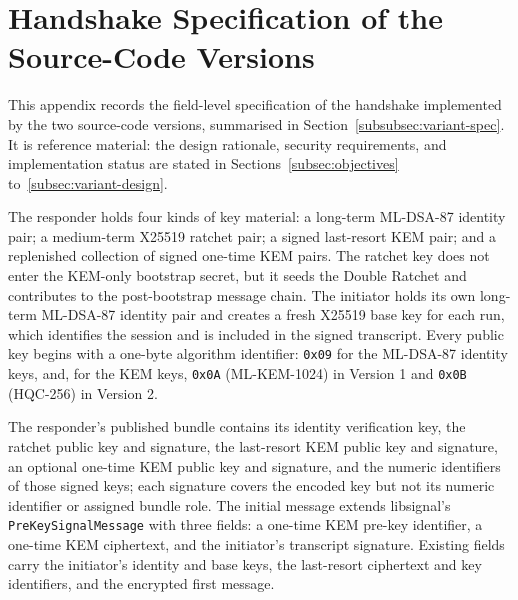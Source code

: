 \section{Handshake Specification of the Source-Code Versions}
\label{app:handshake-spec}

This appendix records the field-level specification of the handshake implemented by the two source-code versions, summarised in Section~\ref{subsubsec:variant-spec}. It is reference material: the design rationale, security requirements, and implementation status are stated in Sections~\ref{subsec:objectives} to~\ref{subsec:variant-design}.

The responder holds four kinds of key material: a long-term ML-DSA-87 identity pair; a medium-term X25519 ratchet pair; a signed last-resort KEM pair; and a replenished collection of signed one-time KEM pairs. The ratchet key does not enter the KEM-only bootstrap secret, but it seeds the Double Ratchet and contributes to the post-bootstrap message chain. The initiator holds its own long-term ML-DSA-87 identity pair and creates a fresh X25519 base key for each run, which identifies the session and is included in the signed transcript. Every public key begins with a one-byte algorithm identifier: \texttt{0x09} for the ML-DSA-87 identity keys, and, for the KEM keys, \texttt{0x0A} (ML-KEM-1024) in Version 1 and \texttt{0x0B} (HQC-256) in Version 2.

The responder's published bundle contains its identity verification key, the ratchet public key and signature, the last-resort KEM public key and signature, an optional one-time KEM public key and signature, and the numeric identifiers of those signed keys; each signature covers the encoded key but not its numeric identifier or assigned bundle role. The initial message extends libsignal's \texttt{PreKeySignalMessage} with three fields: a one-time KEM pre-key identifier, a one-time KEM ciphertext, and the initiator's transcript signature. Existing fields carry the initiator's identity and base keys, the last-resort ciphertext and key identifiers, and the encrypted first message.


